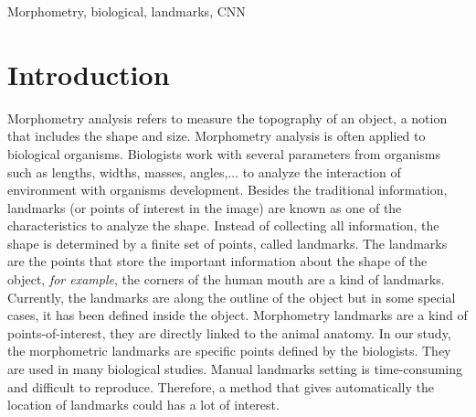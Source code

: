 \documentclass[conference]{IEEEtran}
\begin{document}
\begin{IEEEkeywords}
Morphometry, biological, landmarks, CNN
\end{IEEEkeywords}

\section{Introduction}
Morphometry analysis refers to measure the topography of an object, a notion that includes the shape and size. Morphometry analysis is often applied to biological organisms. Biologists work with several parameters from organisms such as lengths, widths, masses, angles,... to analyze the interaction of environment with organisms development. Besides the traditional information, landmarks (or points of interest in the image) are known as one of the characteristics to analyze the shape. Instead of collecting all information, the shape is determined by a finite set of points, called landmarks. The landmarks are the points that store the important information about the shape of the object, \textit{for example}, the corners of the human mouth are a kind of landmarks. Currently, the landmarks are along the outline of the object but in some special cases, it has been defined inside the object. Morphometry landmarks are a kind of points-of-interest, they are directly linked to the animal anatomy. In our study, the morphometric landmarks are specific points defined by the biologists. They are used in many biological studies. Manual landmarks setting is time-consuming and difficult to reproduce. Therefore, a method that gives automatically the location of landmarks could has a lot of interest.
\end{document}
